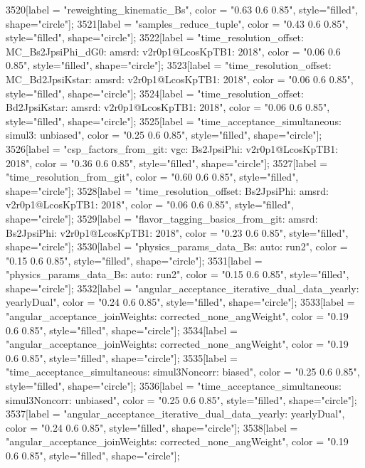 {	3520[label = "reweighting_kinematic_Bs", color = "0.63 0.6 0.85", style="filled", shape="circle"];
	3521[label = "samples_reduce_tuple", color = "0.43 0.6 0.85", style="filled", shape="circle"];
	3522[label = "time_resolution_offset\nmode: MC_Bs2JpsiPhi_dG0\ntimeres: amsrd\nversion: v2r0p1@LcosKpTB1\nyear: 2018", color = "0.06 0.6 0.85", style="filled", shape="circle"];
	3523[label = "time_resolution_offset\nmode: MC_Bd2JpsiKstar\ntimeres: amsrd\nversion: v2r0p1@LcosKpTB1\nyear: 2018", color = "0.06 0.6 0.85", style="filled", shape="circle"];
	3524[label = "time_resolution_offset\nmode: Bd2JpsiKstar\ntimeres: amsrd\nversion: v2r0p1@LcosKpTB1\nyear: 2018", color = "0.06 0.6 0.85", style="filled", shape="circle"];
	3525[label = "time_acceptance_simultaneous\ntimeacc: simul3\ntrigger: unbiased", color = "0.25 0.6 0.85", style="filled", shape="circle"];
	3526[label = "csp_factors_from_git\ncsp: vgc\nmode: Bs2JpsiPhi\nversion: v2r0p1@LcosKpTB1\nyear: 2018", color = "0.36 0.6 0.85", style="filled", shape="circle"];
	3527[label = "time_resolution_from_git", color = "0.60 0.6 0.85", style="filled", shape="circle"];
	3528[label = "time_resolution_offset\nmode: Bs2JpsiPhi\ntimeres: amsrd\nversion: v2r0p1@LcosKpTB1\nyear: 2018", color = "0.06 0.6 0.85", style="filled", shape="circle"];
	3529[label = "flavor_tagging_basics_from_git\nflavor: amsrd\nmode: Bs2JpsiPhi\nversion: v2r0p1@LcosKpTB1\nyear: 2018", color = "0.23 0.6 0.85", style="filled", shape="circle"];
	3530[label = "physics_params_data_Bs\nfit: auto\nyear: run2", color = "0.15 0.6 0.85", style="filled", shape="circle"];
	3531[label = "physics_params_data_Bs\nfit: auto\nyear: run2", color = "0.15 0.6 0.85", style="filled", shape="circle"];
	3532[label = "angular_acceptance_iterative_dual_data_yearly\nangacc: yearlyDual", color = "0.24 0.6 0.85", style="filled", shape="circle"];
	3533[label = "angular_acceptance_joinWeights\nwflag: corrected_none_angWeight", color = "0.19 0.6 0.85", style="filled", shape="circle"];
	3534[label = "angular_acceptance_joinWeights\nwflag: corrected_none_angWeight", color = "0.19 0.6 0.85", style="filled", shape="circle"];
	3535[label = "time_acceptance_simultaneous\ntimeacc: simul3Noncorr\ntrigger: biased", color = "0.25 0.6 0.85", style="filled", shape="circle"];
	3536[label = "time_acceptance_simultaneous\ntimeacc: simul3Noncorr\ntrigger: unbiased", color = "0.25 0.6 0.85", style="filled", shape="circle"];
	3537[label = "angular_acceptance_iterative_dual_data_yearly\nangacc: yearlyDual", color = "0.24 0.6 0.85", style="filled", shape="circle"];
	3538[label = "angular_acceptance_joinWeights\nwflag: corrected_none_angWeight", color = "0.19 0.6 0.85", style="filled", shape="circle"];
}
